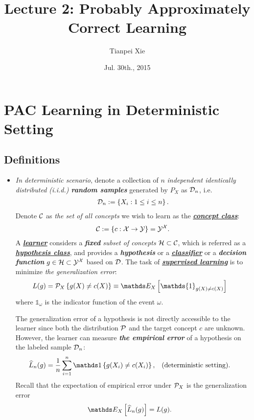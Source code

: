 \documentclass[11pt]{article}
\begin{document}
\title{Lecture 2: Probably Approximately Correct  Learning}
\author{ Tianpei Xie}
\date{ Jul. 30th., 2015 }
\maketitle
\tableofcontents
\newpage
\section{PAC Learning in Deterministic Setting}
\subsection{Definitions}
\begin{itemize}
\item \begin{remark}
\emph{In deterministic scenario}, denote a collection of $n$ \emph{independent identically distributed (i.i.d.) \textbf{random samples}} generated by $P_X$ as ${\mathcal D}_n$, i.e.
\begin{align*}
{\mathcal D}_n:= \left\{X_i: 1\le i\le n\right\}.
\end{align*} Denote ${\mathcal C}$ as \emph{the set of all concepts} we wish to learn as the \underline{\emph{\textbf{concept class}}}:
\begin{align*}
{\mathcal C} := \left\{c: {\mathcal X} \rightarrow {\mathcal Y} \right\} ={\mathcal Y}^{{\mathcal X}}.
\end{align*} A \underline{\emph{\textbf{learner}}}  considers a \emph{\textbf{fixed} subset of concepts}  ${\mathcal H}\subset {\mathcal C}$, which is referred as a \underline{\emph{\textbf{hypothesis class}}}, and provides a \emph{\textbf{hypothesis}} or a \underline{\emph{\textbf{classifier}}} or a \emph{\textbf{decision function}} $g\in {\mathcal H} \subset {\mathcal Y}^{{\mathcal X}}$ based on ${\mathcal D}$. The task of \underline{\emph{\textbf{supervised learning}}} is to minimize \emph{the generalization error}:
\begin{align}
L(g) &= \cP_{X}\set{g(X) \neq c(X)} \equiv \E{X}{\mathds{1}_{g(X)\neq c(X)}}\label{expr: gen_err_determin}
\end{align} where $\mathds{1}_{\omega}$ is the indicator function of the event $\omega$.

The generalization error of a hypothesis is not directly accessible to the learner since both the distribution ${\mathcal P}$ and the target concept $c$ are unknown. However, the
learner can measure \emph{\textbf{the empirical error}} of a hypothesis on the labeled sample ${\mathcal D}_n$:
\begin{align*}
 \widehat{L}_{n}(g) &=\frac{1}{n} \sum_{i=1}^{n}\ind{g(X_i)\neq c(X_i)}, &&  (\text{deterministic setting}).
\end{align*} Recall that the expectation of empirical error under ${\mathcal P}_{X}$ is the generalization error
\begin{align*}
\E{X}{ \widehat{L}_{n}(g)} &= L(g).
\end{align*}
\end{remark}


\end{itemize}
\end{document}
